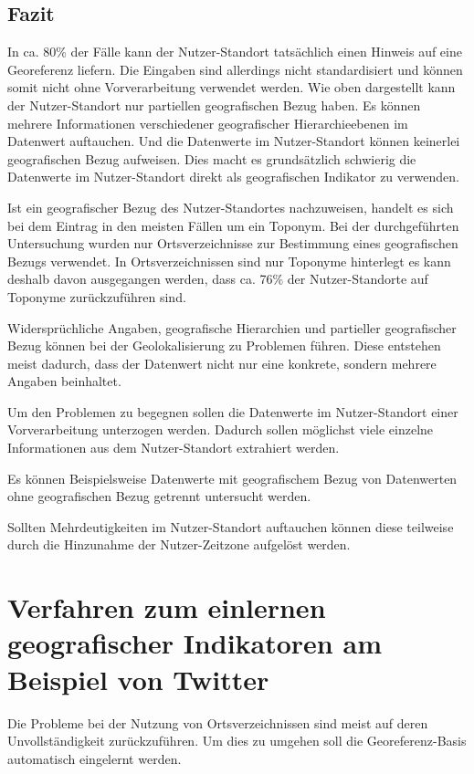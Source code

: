 		\subsection{Fazit} 

			In ca. 80\% der Fälle kann der Nutzer-Standort tatsächlich einen Hinweis auf eine Georeferenz liefern.
			Die Eingaben sind allerdings nicht standardisiert und können somit nicht ohne Vorverarbeitung verwendet werden.
			Wie oben dargestellt kann der Nutzer-Standort nur partiellen geografischen Bezug haben.
			Es können mehrere Informationen verschiedener geografischer Hierarchieebenen im Datenwert auftauchen. 
			Und die Datenwerte im Nutzer-Standort können keinerlei geografischen Bezug aufweisen.
			Dies macht es grundsätzlich schwierig die Datenwerte im Nutzer-Standort direkt als geografischen Indikator zu verwenden.
			
			Ist ein geografischer Bezug des Nutzer-Standortes nachzuweisen, handelt es sich bei dem Eintrag in den meisten Fällen um ein Toponym.
			Bei der durchgeführten Untersuchung wurden nur Ortsverzeichnisse zur Bestimmung eines geografischen Bezugs verwendet.
			In Ortsverzeichnissen sind nur Toponyme hinterlegt es kann deshalb davon ausgegangen werden, dass ca. 76\% der Nutzer-Standorte auf Toponyme zurückzuführen sind.

			Widersprüchliche Angaben, geografische Hierarchien und partieller geografischer Bezug können bei der Geolokalisierung zu Problemen führen.
			Diese entstehen meist dadurch, dass der Datenwert nicht nur eine konkrete, sondern mehrere Angaben beinhaltet.
			
			Um den Problemen zu begegnen sollen die Datenwerte im Nutzer-Standort einer Vorverarbeitung unterzogen werden. 
			Dadurch sollen möglichst viele einzelne Informationen aus dem Nutzer-Standort extrahiert werden.

			Es können Beispielsweise Datenwerte mit geografischem Bezug von Datenwerten ohne geografischen Bezug getrennt untersucht werden.

			Sollten Mehrdeutigkeiten im Nutzer-Standort auftauchen können diese teilweise durch die Hinzunahme der Nutzer-Zeitzone aufgelöst werden.

	\section{Verfahren zum einlernen geografischer Indikatoren am Beispiel von Twitter} \label{sec:einlernen}  

		Die Probleme bei der Nutzung von Ortsverzeichnissen sind meist auf deren Unvollständigkeit zurückzuführen. 
		Um dies zu umgehen soll die Georeferenz-Basis automatisch eingelernt werden. 

